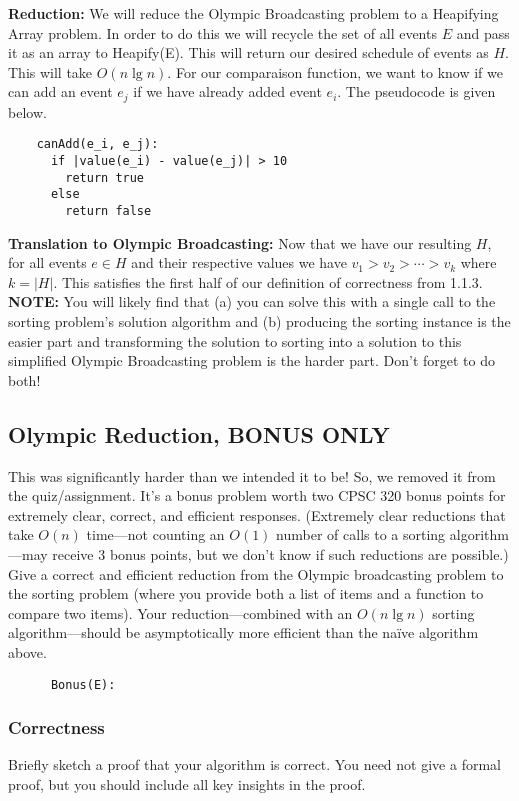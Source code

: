 \documentclass[11pt, oneside]{article}   	%
\theoremstyle{definition}
\theoremstyle{remark}
\begin{document}
\textbf{Reduction: } We will reduce the Olympic Broadcasting problem to a Heapifying Array problem. In order to do this we will recycle the set of all events $E$ and pass it as an array to Heapify(E). This will return our desired schedule of events as $H$. This will take $O(n \lg n)$. For our comparaison function, we want to know if we can add an event $e_j$ if we have already added event $e_i$. The pseudocode is given below.
\begin{verbatim}
	canAdd(e_i, e_j):
	  if |value(e_i) - value(e_j)| > 10
	    return true
	  else
	    return false	
\end{verbatim} 
\textbf{Translation to Olympic Broadcasting: } Now that we have our resulting $H$, for all events $e \in H$ and their respective values we have $v_1 > v_2 > \dotsm> v_k$ where $k =|H|$. This satisfies the first half of our definition of correctness from 1.1.3. 
\textbf{NOTE:} You will likely find that (a) you can solve this with a single
call to the sorting problem's solution algorithm and (b) producing the
sorting instance is the easier part and transforming the solution to
sorting into a solution to this simplified Olympic Broadcasting
problem is the harder part. Don't forget to do both!

\subsection{Olympic Reduction, BONUS ONLY}
This was significantly harder than we intended it to be! So, we
removed it from the quiz/assignment. It's a bonus problem worth two
CPSC 320 bonus points for extremely clear, correct, and efficient
responses. (Extremely clear reductions that take $O(n)$ time---not
counting an $O(1)$ number of calls to a sorting algorithm---may
receive 3 bonus points, but we don't know if such reductions are
possible.)
Give a correct and efficient reduction from the Olympic broadcasting
problem to the sorting problem (where you provide both a list of items
and a function to compare two items). Your reduction---combined with
an $O(n \lg n)$ sorting algorithm---should be asymptotically more
efficient than the na\"ive algorithm above.

\begin{verbatim}
	  Bonus(E):
\end{verbatim}

\subsubsection{Correctness}
Briefly sketch a proof that your algorithm is correct. You need not
give a formal proof, but you should include all key insights in the
proof.
\end{document}
